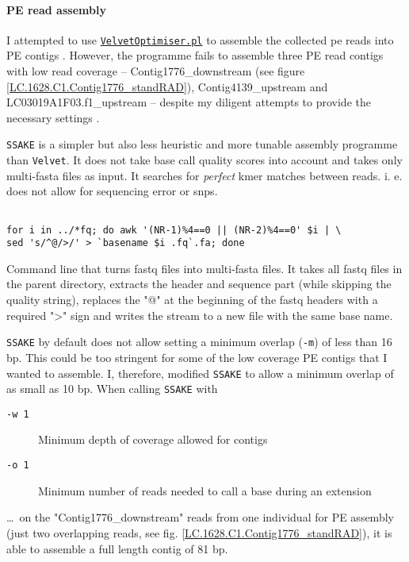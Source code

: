 \documentclass[a4paper,12pt,times,authoryear,twoside,print,index]{Classes/PhDThesisPSnPDF}\usepackage[]{graphicx}\usepackage[]{color}
\begin{document}
\paragraph{PE read assembly}\label{ch:PE_read_assembly}
I attempted to use \href{http://www.vicbioinformatics.com/software.velvetoptimiser.shtml}{\texttt{VelvetOptimiser.pl}} to assemble the collected \gls{pe} reads into PE contigs \citep{Zerbino2008}. However, the programme fails to assemble three PE read contigs with low read coverage -- Contig1776\_downstream (see figure  \ref{LC.1628.C1.Contig1776_standRAD}), Contig4139\_upstream and LC03019A1F03.f1\_upstream -- despite my diligent attempts to provide the necessary settings \citep{Zerbino2010,Davey2012,Etter2011}.

\texttt{SSAKE} \citep{Warren2007} is a simpler but also less heuristic and more tunable assembly programme than \texttt{Velvet}. It does not take base call quality scores into account and takes only multi-fasta files as input. It searches for \emph{perfect} \gls{kmer} matches between reads. i. e. does not allow for sequencing error or \glspl{snp}.
%
\begin{cmd}
\captionsetup{type=cmd} %
\begin{Verbatim}[fontsize=\scriptsize, formatcom=\color{darkgray}]

for i in ../*fq; do awk '(NR-1)%4==0 || (NR-2)%4==0' $i | \
sed 's/^@/>/' > `basename $i .fq`.fa; done
\end{Verbatim}
\caption[ fastq files into multi-fasta files]{\small Command line that turns fastq files into multi-fasta files. It takes all fastq files in the parent directory, extracts the header and sequence part (while skipping the quality string), replaces the "@" at the beginning of the fastq headers with a required ">" sign and writes the stream to a new file with the same base name.}
\label{fastq_to_fasta}
\end{cmd}
%
\texttt{SSAKE} by default does not allow setting a minimum overlap (\texttt{-m}) of less than 16 \gls{bp}. This could be too stringent for some of the low coverage PE contigs that I wanted to assemble. I, therefore, modified \texttt{SSAKE} to allow a minimum overlap of as small as 10 bp. When calling \texttt{SSAKE} with
%
\begin{description}
\item[\texttt{-w 1}] \textmd{Minimum depth of coverage allowed for contigs}
\item[\texttt{-o 1}] \textmd{Minimum number of reads needed to call a base during an extension}
\end{description}
%
\dots~on the "Contig1776\_downstream" reads from one individual for PE assembly (just two overlapping reads, see fig. \ref{LC.1628.C1.Contig1776_standRAD}), it is able to assemble a full length contig of 81 bp.
\end{document}
